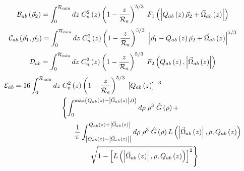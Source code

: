 \begin{equation}\label{caliph_B}
\mathcal{B}_{ab}\left(\vec{\rho}_{2}\right) = 
\int_{0}^{\mathcal{R}_{\rm min}} dz \; C_{n}^{2}\left(z\right) \left( 1 - \frac{z}{\mathcal{R}_{a}}\right)^{5/3}\; 
F_{1}\left(\left\vert Q_{ab}\left(z\right)\vec{\rho}_{2} + \vec{\Omega}_{ab}\left(z\right)\right\vert\right)
\end{equation}
\begin{equation}\label{caliph_C}
\mathcal{C}_{ab}\left(\vec{\rho}_{1}, \vec{\rho}_{2}\right) = 
\int_{0}^{\mathcal{R}_{\rm min}} dz \; C_{n}^{2}\left(z\right) \left( 1 - \frac{z}{\mathcal{R}_{a}}\right)^{5/3}\; 
\left\vert\vec{\rho}_{1} - Q_{ab}\left(z\right)\vec{\rho}_{2} + \vec{\Omega}_{ab}\left(z\right)\right\vert^{5/3}
\end{equation}
\begin{equation}\label{caliph_D}
\mathcal{D}_{ab} = 
\int_{0}^{\mathcal{R}_{\rm min}} dz \; C_{n}^{2}\left(z\right) \left( 1 - \frac{z}{\mathcal{R}_{a}}\right)^{5/3}\; 
F_{2}\left(Q_{ab}\left(z\right),\left\vert\vec{\Omega}_{ab}\left(z\right)\right\vert\right)
\end{equation}
\begin{equation}\label{caliph_E}
\begin{split}
\mathcal{E}_{ab} = 
16 \int_{0}^{\mathcal{R}_{\rm min}} dz & \; C_{n}^{2}\left(z\right) \left( 1 - \frac{z}{\mathcal{R}_{a}}\right)^{5/3}\; 
\left[Q_{ab}\left(z\right)\right]^{-3}
\\ 
& \left\{\int_{0}^{{\rm max}\left(Q_{ab}\left(z\right)-\left\vert \vec{\Omega}_{ab} \left(z\right)\right\vert,0\right)} d\rho \; \rho^{3} \; \hat{G}\left(\rho\right) + 
\right.
\\ 
& 
\quad\quad
\frac{1}{\pi} \int^{Q_{ab}\left(z\right)+\left\vert \vec{\Omega}_{ab}\left(z\right)\right\vert}_{\left\vert Q_{ab}\left(z\right)-\left\vert \vec{\Omega}_{ab}\left(z\right)\right\vert\right\vert}
d\rho \; \rho^{3} \; \hat{G}\left(\rho\right) L\left(\left\vert\vec{\Omega}_{ab}\left(z\right)\right\vert, \rho, Q_{ab}\left(z\right)\right) \\
& 
\quad\quad\quad\quad
\left.
\sqrt{1 - \left[L\left(\left\vert\vec{\Omega}_{ab}\left(z\right)\right\vert, \rho, Q_{ab}\left(z\right)\right)\right]^{2}}
\vphantom{\int_{0}^{{\rm max}\left(Q_{ab}\left(z\right)-\left\vert \vec{\Omega}_{ab} \left(z\right)\right\vert,0\right)}}
\right\} 
\end{split}
\end{equation}
